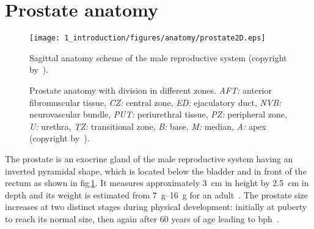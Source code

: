 
\section{Prostate anatomy}\label{section:intro:anatomy}

\begin{figure}
\centering
\texttt{[image: 1\_introduction/figures/anatomy/prostate2D.eps]}
\caption[Sagittal anatomy of prostate.]{Sagittal anatomy scheme of the male reproductive system (copyright by~\cite{Geckomedia2011}).}
\label{fig:prostatelocation}
\end{figure}

\begin{figure}
	\centering
	\hspace*{\fill}
			\hfill
	\hspace*{\fill}
	\caption[Prostate anatomy.]{Prostate anatomy with division in different zones. \textit{AFT:} anterior fibromuscular tissue, \textit{CZ:} central zone, \textit{ED:} ejaculatory duct, \textit{NVB:} neurovascular bundle, \textit{PUT:} periurethral tissue, \textit{PZ:} peripheral zone, \textit{U:} urethra, \textit{TZ:} transitional zone, \textit{B:} base, \textit{M:} median, \textit{A:} apex (copyright by~\cite{Choi2007}).}
	\label{fig:anatomyProstateZone}
\end{figure}

The prostate is an exocrine gland of the male reproductive system having an inverted pyramidal shape, which is located below the bladder and in front of the rectum as shown in \acs{fig}\,\ref{fig:prostatelocation}.
It measures approximately \SI{3}{\cm} in height by \SI{2.5}{\cm} in depth and its weight is estimated from \SIrange{7}{16}{\gram} for an adult~\cite{Leissner1979}.
The prostate size increases at two distinct stages during physical development: initially at puberty to reach its normal size, then again after 60 years of age leading to \ac{bph}~\cite{Parfait2010}.


